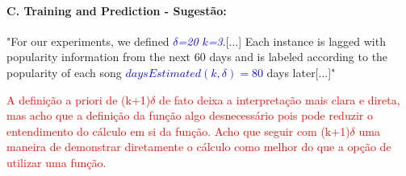 \documentclass{article}
\begin{document}
\paragraph{C. Training and Prediction - Sugestão: }
"For our experiments, we defined \textcolor{blue} {\textit{\(\delta\)=20 \(k\)=3}}.[...] Each instance is lagged with popularity information from the next 60 days and is labeled according to the
popularity of each song \textcolor{blue} {\textit{\( daysEstimated(k, \delta)= 80\)}} days later[...]"

\textcolor{red}{A definição a priori  de (k+1)\(\delta\) de fato deixa a interpretação mais clara e direta, mas acho que a definição da função algo desnecessário pois pode reduzir o entendimento do cálculo em si da função. Acho que seguir com (k+1)\(\delta\) uma maneira de demonstrar diretamente o cálculo como melhor do que a opção de utilizar uma função.}
\end{document}
